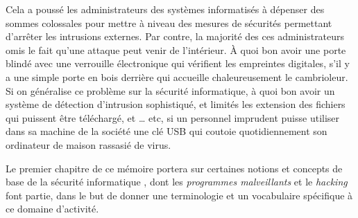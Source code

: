 Cela a poussé les administrateurs des systèmes informatisés à dépenser des sommes colossales pour mettre à niveau 
des mesures de sécurités permettant d'arrêter les intrusions externes. Par contre, la majorité des ces administrateurs omis le fait qu'une attaque peut venir de l'intérieur.%
 À quoi bon avoir une porte 
blindé avec une verrouille électronique qui vérifient les empreintes digitales, s'il y a 
une simple porte en bois derrière qui accueille chaleureusement le cambrioleur. Si on généralise ce problème
sur la sécurité informatique, à quoi bon avoir un système de détection d'intrusion sophistiqué, et limités
les extension des 
fichiers qui puissent être téléchargé, et \ldots{} etc, si un personnel imprudent puisse utiliser dans sa machine de la 
société une clé USB qui coutoie quotidiennement son ordinateur de maison rassasié de virus. %







Le premier chapitre de ce mémoire portera sur certaines notions et concepts de base de la sécurité informatique
, dont les \emph{programmes malveillants} et le \emph{hacking} font partie, dans le but de donner une terminologie et un vocabulaire spécifique à ce domaine d'activité.

